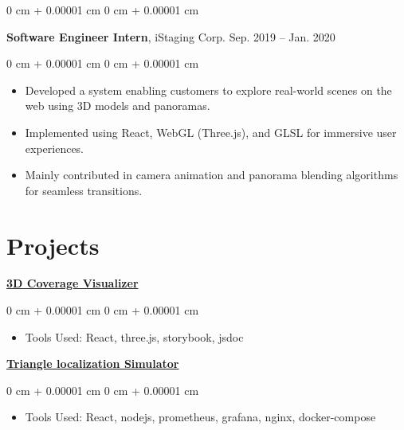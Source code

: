 \documentclass[10pt, letterpaper]{article}
\newenvironment{highlights}{
    \begin{itemize}[
        topsep=0.10 cm,
        parsep=0.10 cm,
        partopsep=0pt,
        itemsep=0pt,
        leftmargin=0 cm + 10pt
    ]
}{
    \end{itemize}
} %
\newenvironment{onecolentry}{
    \begin{adjustwidth}{
        0 cm + 0.00001 cm
    }{
        0 cm + 0.00001 cm
    }
}{
    \end{adjustwidth}
} %
\newenvironment{twocolentry}[2][]{
    \onecolentry
    \def\secondColumn{#2}
    \setcolumnwidth{\fill, 4.5 cm}
    \begin{paracol}{2}
}{
    \switchcolumn \raggedleft \secondColumn
    \end{paracol}
    \endonecolentry
} %
\begin{document}
        \vspace{0.2 cm}

        \begin{twocolentry}{
            Sep. 2019 – Jan. 2020
        }
            \textbf{Software Engineer Intern}, iStaging Corp.\end{twocolentry}

        \vspace{0.10 cm}
        \begin{onecolentry}
            \begin{highlights}
                \item Developed a system enabling customers to explore real-world scenes on the web using 3D models and panoramas.
                \item Implemented using React, WebGL (Three.js), and GLSL for immersive user experiences.
                \item Mainly contributed in camera animation and panorama blending algorithms for seamless transitions.
            \end{highlights}
        \end{onecolentry}

    \section{Projects}
        

        \href{https://github.com/tsengyushiang/coverage-visualizer}{\textbf{3D Coverage Visualizer}}

        \vspace{0.10 cm}
        \begin{onecolentry}
            \begin{highlights}
                \item Tools Used: React, three.js, storybook, jsdoc
            \end{highlights}
        \end{onecolentry}

        \vspace{0.2 cm}

        \href{https://github.com/tsengyushiang/triangle-localization-simulator}{\textbf{Triangle localization Simulator}}
        \vspace{0.10 cm}
        \begin{onecolentry}
            \begin{highlights}
                \item Tools Used: React, nodejs, prometheus, grafana, nginx, docker-compose
            \end{highlights}
        \end{onecolentry}
\end{document}
